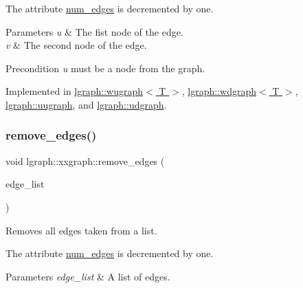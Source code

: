 The attribute \hyperlink{classlgraph_1_1xxgraph_a6765a9a3be42f6e0f824635c593b35d7}{num\+\_\+edges} is decremented by one. 
\begin{DoxyParams}{Parameters}
{\em u} & The fist node of the edge. \\
\hline
{\em v} & The second node of the edge. \\
\hline
\end{DoxyParams}
\begin{DoxyPrecond}{Precondition}
{\itshape u} must be a node from the graph. 
\end{DoxyPrecond}


Implemented in \hyperlink{classlgraph_1_1wugraph_a3debc0be0d08b7cfcbe942aadbe81e1f}{lgraph\+::wugraph$<$ T $>$}, \hyperlink{classlgraph_1_1wdgraph_a6bdc75a07568928bc179dde03a814366}{lgraph\+::wdgraph$<$ T $>$}, \hyperlink{classlgraph_1_1uugraph_ae38adf44fd8f44d7f940710a0f8f3b35}{lgraph\+::uugraph}, and \hyperlink{classlgraph_1_1udgraph_af1225a134bea314254c03e18a18a41d2}{lgraph\+::udgraph}.

\mbox{\label{classlgraph_1_1xxgraph_aef7c4bf62f3f4db362b2d3accb3b6d3d}} 
\subsubsection{\texorpdfstring{remove\+\_\+edges()}{remove\_edges()}}
{\footnotesize\ttfamily void lgraph\+::xxgraph\+::remove\+\_\+edges (\begin{DoxyParamCaption}\item[{const std\+::vector$<$ \hyperlink{namespacelgraph_a76bd7d50719f03de7a85db259d80d572}{edge} $>$ \&}]{edge\+\_\+list }\end{DoxyParamCaption})}



Removes all edges taken from a list. 

The attribute \hyperlink{classlgraph_1_1xxgraph_a6765a9a3be42f6e0f824635c593b35d7}{num\+\_\+edges} is decremented by one. 
\begin{DoxyParams}{Parameters}
{\em edge\+\_\+list} & A list of edges. \\
\hline
\end{DoxyParams}
\mbox{\label{classlgraph_1_1xxgraph_a5b9e033f38a3ab34734be61aa9344c84}} 
